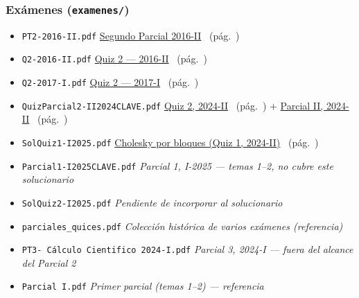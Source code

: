 \documentclass[11pt,a4paper]{article}
\begin{document}
\subsubsection*{Ex\'amenes (\texttt{examenes/})}
\begin{itemize}[leftmargin=0pt, itemsep=3pt, label={}]
  \item \texttt{PT2-2016-II.pdf}
    \dotfill \hyperref[sec:pt2_2016_p1]{Segundo Parcial 2016-II}
    \ (p\'ag.~\pageref{sec:pt2_2016_p1})

  \item \texttt{Q2-2016-II.pdf}
    \dotfill \hyperref[sec:q2_2016_p1]{Quiz 2 --- 2016-II}
    \ (p\'ag.~\pageref{sec:q2_2016_p1})

  \item \texttt{Q2-2017-I.pdf}
    \dotfill \hyperref[sec:q2_2017_p1]{Quiz 2 --- 2017-I}
    \ (p\'ag.~\pageref{sec:q2_2017_p1})

  \item \texttt{QuizParcial2-II2024CLAVE.pdf}
    \dotfill \hyperref[sec:q2_2024_p1]{Quiz 2, 2024-II}
    \ (p\'ag.~\pageref{sec:q2_2024_p1})
    $+$ \hyperref[sec:parcial2_2024_p1]{Parcial II, 2024-II}
    \ (p\'ag.~\pageref{sec:parcial2_2024_p1})

  \item \texttt{SolQuiz1-I2025.pdf}
    \dotfill \hyperref[sec:q1_2024_p1]{Cholesky por bloques (Quiz 1, 2024-II)}
    \ (p\'ag.~\pageref{sec:q1_2024_p1})

  \item \texttt{Parcial1-I2025CLAVE.pdf}
    \dotfill \textit{Parcial 1, I-2025 --- temas 1--2, no cubre este solucionario}

  \item \texttt{SolQuiz2-I2025.pdf}
    \dotfill \textit{Pendiente de incorporar al solucionario}

  \item \texttt{parciales\_quices.pdf}
    \dotfill \textit{Colecci\'on hist\'orica de varios ex\'amenes (referencia)}

  \item \texttt{PT3-~C\'alculo~Cientifico~2024-I.pdf}
    \dotfill \textit{Parcial 3, 2024-I --- fuera del alcance del Parcial 2}

  \item \texttt{Parcial~I.pdf}
    \dotfill \textit{Primer parcial (temas 1--2) --- referencia}
\end{itemize}
\end{document}
